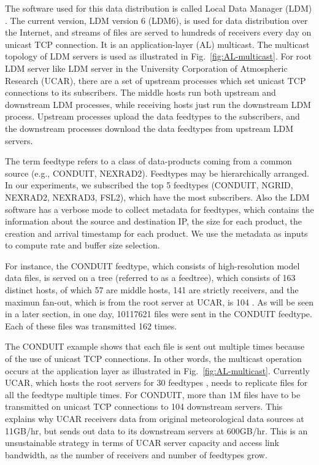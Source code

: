 The software used for this data distribution is called Local Data Manager (LDM) \cite{IDD}. The current version, LDM version 6 (LDM6), is used for data distribution over the Internet, and streams of files are served to hundreds of receivers every day on unicast TCP connection. It is an application-layer (AL) multicast. The multicast topology of LDM servers is used as illustrated in Fig.~\ref{fig:AL-multicast}. For root LDM server like LDM server in the University Corporation of Atmospheric Research (UCAR), there are a set of upstream processes which set unicast TCP connections to its subscribers. The middle hosts run both upstream and downstream LDM processes, while receiving hosts just run the downstream LDM process. Upstream processes upload the data feedtypes to the subscribers, and the downstream processes download the data feedtypes from upstream LDM servers.

The term feedtype refers to a class of data-products coming from a common source (e.g., CONDUIT, NEXRAD2). Feedtypes may be hierarchically arranged. In our experiments, we subscribed the top 5 feedtypes (CONDUIT, NGRID, NEXRAD2, NEXRAD3, FSL2), which have the most subscribers. Also the LDM software has a verbose mode to collect metadata for feedtypes, which contains the information about the source and destination IP, the size for each product, the creation and arrival timestamp for each product. We use the metadata as inputs to compute rate and buffer size selection.

For instance, the CONDUIT feedtype, which consists of high-resolution model data files, is served on a tree (referred to as a feedtree), which consists of 163 distinct hosts, of which 57 are middle hosts, 141 are strictly receivers, and the maximun fan-out, which is from the root server at UCAR, is 104 \cite{CMC-LDM}. As will be seen in a later section, in one day, 10117621 files were sent in the CONDUIT feedtype. Each of these files was transmitted 162 times.

The CONDUIT example shows that each file is sent out multiple times because of the use of unicast TCP connections. In other words, the multicast operation occurs at the application layer as illustrated in Fig.~\ref{fig:AL-multicast}. Currently UCAR, which hosts the root servers for 30 feedtypes \cite{IDD_Realtime}, needs to replicate files for all the feedtype multiple times. For CONDUIT, more than 1M files have to be transmitted on unicast TCP connections to 104 downstream servers. This explains why UCAR receivers data from original meteorological data sources at 11GB/hr, but sends out data to its downstream servers at 600GB/hr. This is an unsustainable strategy in terms of UCAR server capacity and access link bandwidth, as the number of receivers and number of feedtypes grow.

